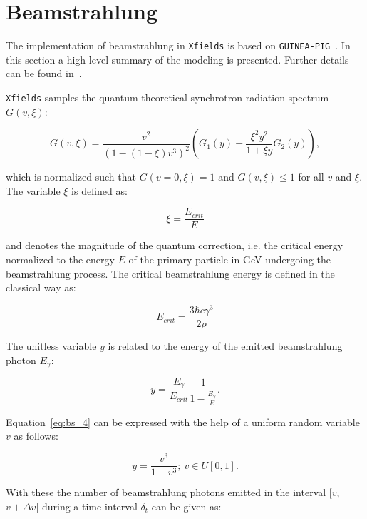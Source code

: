 \section{Beamstrahlung}
The implementation of beamstrahlung in \texttt{Xfields} is based on \texttt{GUINEA-PIG}~\cite{guineapig}. In this section a high level summary of the modeling is presented. Further details can be found in~\cite{Yokoya:1985ab}. 

\texttt{Xfields} samples the quantum theoretical synchrotron radiation spectrum $G(v,\xi)$:

\begin{equation}
G(v,\xi) = \frac{v^2}{(1 - (1 - \xi)v^3)^2}\left( G_1(y) + \frac{\xi^2 y^2}{1 + \xi y}G_2(y) \right),
 	\label{eq:bs_1}
\end{equation}

which is normalized such that $G(v=0,\xi)=1$ and $G(v,\xi)\leq1$ for all $v$ and $\xi$. The variable $\xi$ is defined as:

\begin{equation}
	\xi=\frac{E_{crit}}{E} 
	\label{eq:bs_2}
\end{equation}

and denotes the magnitude of the quantum correction, i.e. the critical energy normalized to the energy $E$ of the primary particle in GeV undergoing the beamstrahlung process. The critical beamstrahlung energy is defined in the classical way as:

\begin{equation}
 E_{crit}=\frac{3\hbar c\gamma^3}{2\rho}
	\label{eq:bs_3}
\end{equation}

The unitless variable $y$ is related to the energy of the emitted beamstrahlung photon $E_{\gamma}$:

\begin{equation}
	y = \frac{E_{\gamma}}{E_{crit}} \frac{1}{1 - \frac{E_{\gamma}}{E}}.
	\label{eq:bs_4}
\end{equation}

Equation~\ref{eq:bs_4} can be expressed with the help of a uniform random variable $v$ as follows:

\begin{equation}
	y = \frac{v^3}{1 - v^3};~v\in U[0,1].
	\label{eq:bs_5}
\end{equation}

With these the number of beamstrahlung photons emitted in the interval [$v$, $v+\Delta v$] during a time interval $\delta_t$ can be given as:


